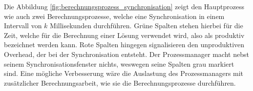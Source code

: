 Die Abbildung \ref{fig:berechnungsprozess_synchronisation} zeigt den Hauptprozess wie auch zwei Berechnungsprozesse, welche
eine Synchronisation in einem Intervall von $k$ Millisekunden durchführen. Grüne Spalten stehen hierbei für die Zeit, welche für die Berechnung
einer Lösung verwendet wird, also als produktiv bezeichnet werden kann. Rote Spalten hingegen signalisieren den unproduktiven
Overhead, der bei der Synchronisation entsteht. Der Prozessmanager macht nebst seinem Synchronisationsfenster nichts,
weswegen seine Spalten grau markiert sind. Eine mögliche Verbesserung wäre die Auslastung des Prozessmanagers mit zusätzlicher
Berechnungsarbeit, wie sie die Berechnungsprozesse durchführen.
